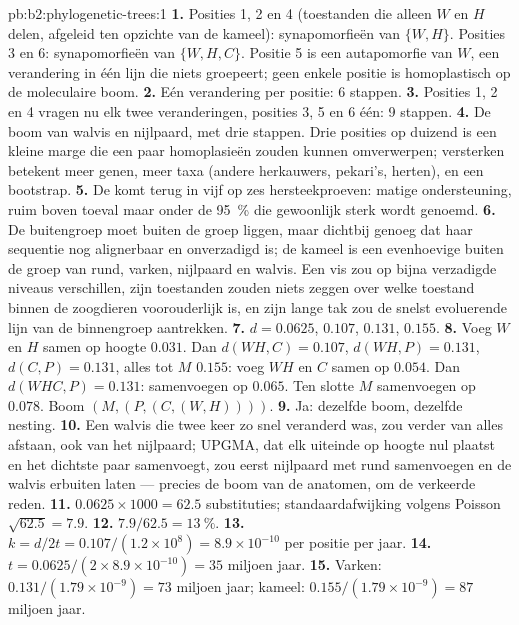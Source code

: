 \begin{solution}{pb:b2:phylogenetic-trees:1}
\textbf{1.} Posities 1, 2 en 4 (toestanden die alleen $W$ en $H$ delen,
afgeleid ten opzichte van de kameel): synapomorfieën van $\{W,H\}$. Posities 3
en 6: synapomorfieën van $\{W,H,C\}$. Positie 5 is een autapomorfie van
$W$, een verandering in één lijn die niets groepeert; geen enkele positie is
homoplastisch op de moleculaire boom.
\textbf{2.} Eén verandering per positie: 6 stappen.
\textbf{3.} Posities 1, 2 en 4 vragen nu elk twee veranderingen, posities 3, 5
en 6 één: 9 stappen.
\textbf{4.} De boom van walvis en nijlpaard, met drie stappen. Drie posities op
duizend is een kleine marge die een paar homoplasieën zouden kunnen
omverwerpen; versterken betekent meer genen, meer taxa (andere
herkauwers, pekari's, herten), en een bootstrap.
\textbf{5.} De  komt terug in vijf op zes hersteekproeven: matige
ondersteuning, ruim boven toeval maar onder de \qty{95}{\%}
die gewoonlijk sterk wordt genoemd.
\textbf{6.} De buitengroep moet buiten de groep liggen, maar dichtbij genoeg
dat haar sequentie nog alignerbaar en onverzadigd is; de kameel is een
evenhoevige buiten de groep van rund, varken, nijlpaard en walvis. Een
vis zou op bijna verzadigde niveaus verschillen, zijn toestanden zouden niets
zeggen over welke toestand binnen de zoogdieren voorouderlijk is,
en zijn lange tak zou de snelst evoluerende lijn van de binnengroep
aantrekken.
\textbf{7.} $d = 0.0625$, $0.107$, $0.131$, $0.155$.
\textbf{8.} Voeg $W$ en $H$ samen op hoogte $0.031$. Dan $d(WH,C) =
0.107$, $d(WH,P) = 0.131$, $d(C,P) = 0.131$, alles tot $M$
$0.155$: voeg $WH$ en $C$ samen op $0.054$. Dan $d(WHC,P) = 0.131$: samenvoegen
op $0.065$. Ten slotte $M$ samenvoegen op $0.078$. Boom $(M,(P,(C,(W,H))))$.
\textbf{9.} Ja: dezelfde boom, dezelfde nesting.
\textbf{10.} Een walvis die twee keer zo snel veranderd was, zou verder van
alles afstaan, ook van het nijlpaard; UPGMA, dat elk uiteinde op hoogte nul
plaatst en het dichtste paar samenvoegt, zou eerst nijlpaard met rund
samenvoegen en de walvis erbuiten laten --- precies de boom van de anatomen,
om de verkeerde reden.
\textbf{11.} $0.0625\times 1000 = 62.5$ substituties; standaardafwijking
volgens Poisson $\sqrt{62.5} = 7.9$.
\textbf{12.} $7.9/62.5 = \qty{13}{\%}$.
\textbf{13.} $k = d/2t = 0.107/(1.2\times 10^{8}) = 8.9\times 10^{-10}$
per positie per jaar.
\textbf{14.} $t = 0.0625/(2\times 8.9\times 10^{-10}) = 35$ miljoen
jaar.
\textbf{15.} Varken: $0.131/(1.79\times 10^{-9}) = 73$ miljoen jaar;
kameel: $0.155/(1.79\times 10^{-9}) = 87$ miljoen jaar.

\end{solution}

